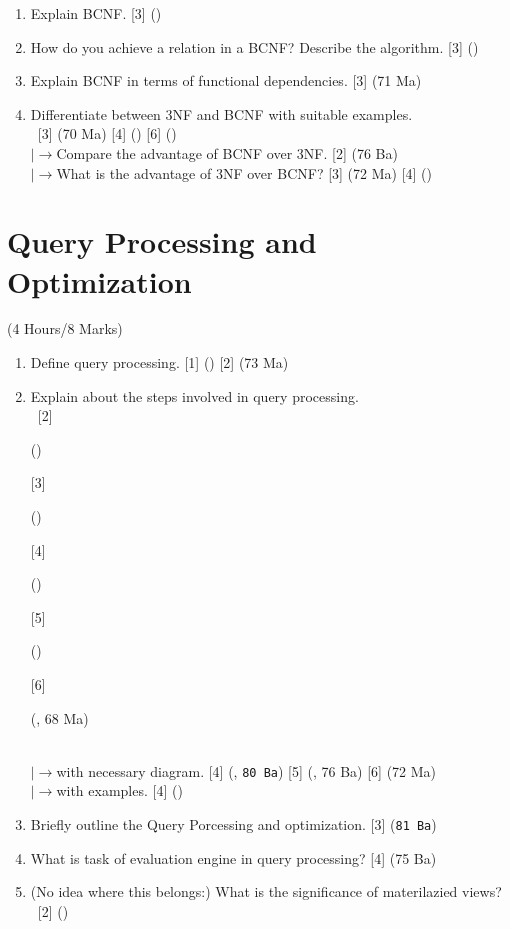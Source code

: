 \documentclass[12pt]{article}
\newcommand{\lb}{\\$\left|\rightarrow\right.$}
\newcommand{\enter}{\\\textcolor{white}{1}}
\begin{document}
\begin{enumerate}[noitemsep, topsep = 0pt]
        \item Explain BCNF. \hfill [3] ()
        
        \item How do you achieve a relation in a BCNF? Describe the algorithm. \hfill [3] ()
        
        \item Explain BCNF in terms of functional dependencies. \hfill [3] (71 Ma)
        
        \item Differentiate between 3NF and BCNF with suitable examples.
        \enter\hfill [3] (70 Ma) [4] () [6] ()
        \lb Compare the advantage of BCNF over 3NF. \hfill [2] (76 Ba)
        \lb What is the advantage of 3NF over BCNF? \hfill [3] (72 Ma) [4] ()
    \end{enumerate}

    \pagebreak
\section{Query Processing and Optimization}
    \begin{center}(4 Hours/8 Marks)\end{center}
     \begin{enumerate}[noitemsep, topsep=0pt]
        	\item Define query processing. \hfill [1] () [2] (73 Ma)
        	
        \item Explain about the steps involved in query processing. 
        \enter\hfill [2] \begin{footnotesize}()\end{footnotesize} [3] \begin{footnotesize}()\end{footnotesize} [4] \begin{footnotesize}()\end{footnotesize} [5] \begin{footnotesize}()\end{footnotesize} [6] \begin{footnotesize}(, 68 Ma)\end{footnotesize}
        		\lb with necessary diagram. \hfill [4] (, \texttt{80 Ba}) [5] (, 76 Ba) [6] (72 Ma)
        		\lb with examples. \hfill [4] ()
            
     	\item Briefly outline the Query Porcessing and optimization. \hfill [3] (\texttt{81 Ba})
     	
     	\item What is task of evaluation engine in query processing? \hfill [4] (75 Ba)
     	
     	\item (No idea where this belongs:) What is the significance of materilazied views? 
     	\enter\hfill [2] ()
  	\end{enumerate}
        
\end{document}
